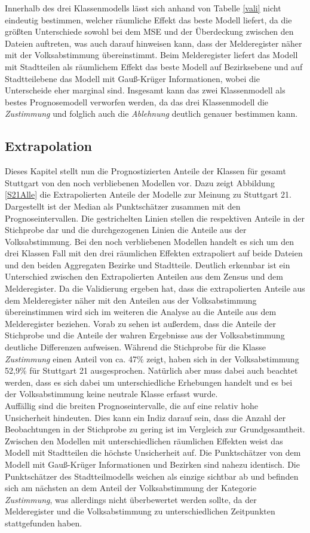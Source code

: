\documentclass{Vorlage}
\begin{document}
Innerhalb des drei Klassenmodells lässt sich anhand von Tabelle \ref{vali} nicht eindeutig bestimmen, welcher räumliche Effekt das beste Modell liefert, da die größten Unterschiede sowohl bei dem MSE und der Überdeckung zwischen den Dateien auftreten, was auch darauf hinweisen kann, dass der Melderegister näher mit der Volksabstimmung übereinstimmt. Beim Melderegister liefert das Modell mit Stadtteilen als räumlichem Effekt das beste Modell auf Bezirksebene und auf Stadtteilebene das Modell mit Gauß-Krüger Informationen, wobei die Unterscheide eher marginal sind. Insgesamt kann das zwei Klassenmodell als bestes Prognosemodell verworfen werden, da das drei Klassenmodell die \textit{Zustimmung} und folglich auch die \textit{Ablehnung} deutlich genauer bestimmen kann.

\subsection{Extrapolation}

Dieses Kapitel stellt nun die Prognostizierten Anteile der Klassen für gesamt Stuttgart von den noch verbliebenen Modellen vor. Dazu zeigt Abbildung \ref{S21Alle} die Extrapolierten Anteile der Modelle zur Meinung zu Stuttgart 21. Dargestellt ist der Median als Punktschätzer zusammen mit den Prognoseintervallen. Die gestrichelten Linien stellen die respektiven Anteile in der Stichprobe dar und die durchgezogenen Linien die Anteile aus der Volksabstimmung. Bei den noch verbliebenen Modellen handelt es sich um den drei Klassen Fall mit den drei räumlichen Effekten extrapoliert auf beide Dateien und den beiden Aggregaten Bezirke und Stadtteile. Deutlich erkennbar ist ein Unterschied zwischen den Extrapolierten Anteilen aus dem Zensus und dem Melderegister. Da die Validierung ergeben hat, dass die extrapolierten Anteile aus dem Melderegister näher mit den Anteilen aus der Volksabstimmung übereinstimmen wird sich im weiteren die Analyse au die Anteile aus dem Melderegister beziehen. Vorab zu sehen ist außerdem, dass die Anteile der Stichprobe und die Anteile der wahren Ergebnisse aus der Volksabstimmung deutliche Differenzen aufweisen. Während die Stichprobe für die Klasse \textit{Zustimmung} einen Anteil von ca. 47\% zeigt, haben sich in der Volksabstimmung 52,9\% für Stuttgart 21 ausgesprochen. Natürlich aber muss dabei auch beachtet werden, dass es sich dabei um unterschiedliche Erhebungen handelt und es bei der Volksabstimmung keine neutrale Klasse erfasst wurde.\\
Auffällig sind die breiten Prognoseintervalle, die auf eine relativ hohe Unsicherheit hindeuten. Dies kann ein Indiz darauf sein, dass die Anzahl der Beobachtungen in der Stichprobe zu gering ist im Vergleich zur Grundgesamtheit. Zwischen den Modellen mit unterschiedlichen räumlichen Effekten weist das Modell mit Stadtteilen die höchste Unsicherheit auf. Die Punktschätzer von dem Modell mit Gauß-Krüger Informationen und Bezirken sind nahezu identisch. Die Punktschätzer des Stadtteilmodells weichen als einzige sichtbar ab und befinden sich am nächsten an dem Anteil der Volksabstimmung der Kategorie \textit{Zustimmung}, was allerdings nicht überbewertet werden sollte, da der Melderegister und die Volksabstimmung zu unterschiedlichen Zeitpunkten stattgefunden haben. 
\end{document}
